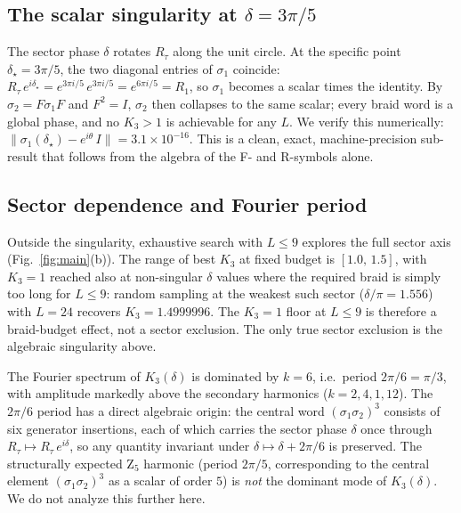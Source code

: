 \documentclass[aps,prx,reprint,amsmath,amssymb,floatfix,nofootinbib,superscriptaddress]{revtex4-2}
\begin{document}
\subsection{The scalar singularity at $\delta = 3\pi/5$}

The sector phase $\delta$ rotates $R_{\tau}$ along the unit circle.
At the specific point $\delta_{\star} = 3\pi/5$, the two diagonal
entries of $\sigma_{1}$ coincide:
$R_{\tau} \, e^{i\delta_{\star}}
   = e^{3\pi i/5} \, e^{3\pi i/5}
   = e^{6\pi i/5}
   = R_{1}$,
so $\sigma_{1}$ becomes a scalar times the identity. By
$\sigma_{2} = F \sigma_{1} F$ and $F^{2} = I$, $\sigma_{2}$ then
collapses to the same scalar; every braid word is a global phase, and
no $K_{3} > 1$ is achievable for any $L$. We verify this numerically:
$\|\sigma_{1}(\delta_{\star}) - e^{i\theta}\,I\| = 3.1 \times 10^{-16}$.
This is a clean, exact, machine-precision sub-result that follows
from the algebra of the F- and R-symbols alone.

\subsection{Sector dependence and Fourier period}

Outside the singularity, exhaustive search with $L \leq 9$ explores
the full sector axis (Fig.~\ref{fig:main}(b)). The range of best
$K_{3}$ at fixed budget is $[1.0,\, 1.5]$, with $K_{3} = 1$ reached
also at non-singular $\delta$ values where the required braid is
simply too long for $L \leq 9$: random sampling at the weakest such
sector ($\delta/\pi = 1.556$) with $L = 24$ recovers $K_{3} =
1.4999996$. The $K_{3} = 1$ floor at $L \leq 9$ is therefore a
braid-budget effect, not a sector exclusion. The only true sector
exclusion is the algebraic singularity above.

The Fourier spectrum of $K_{3}(\delta)$ is dominated by $k=6$, i.e.\
period $2\pi/6 = \pi/3$, with amplitude markedly above the secondary
harmonics ($k=2, 4, 1, 12$). The $2\pi/6$ period has a direct
algebraic origin: the central word $(\sigma_{1}\sigma_{2})^{3}$
consists of six generator insertions, each of which carries the
sector phase $\delta$ once through $R_{\tau} \mapsto R_{\tau}\,e^{i\delta}$,
so any quantity invariant under $\delta \mapsto \delta + 2\pi/6$
is preserved. The structurally expected $\mathrm{Z}_{5}$ harmonic
(period $2\pi/5$, corresponding to the central element
$(\sigma_{1}\sigma_{2})^{3}$ as a scalar of order $5$) is
\emph{not} the dominant mode of $K_{3}(\delta)$. We do not
analyze this further here.
\end{document}
